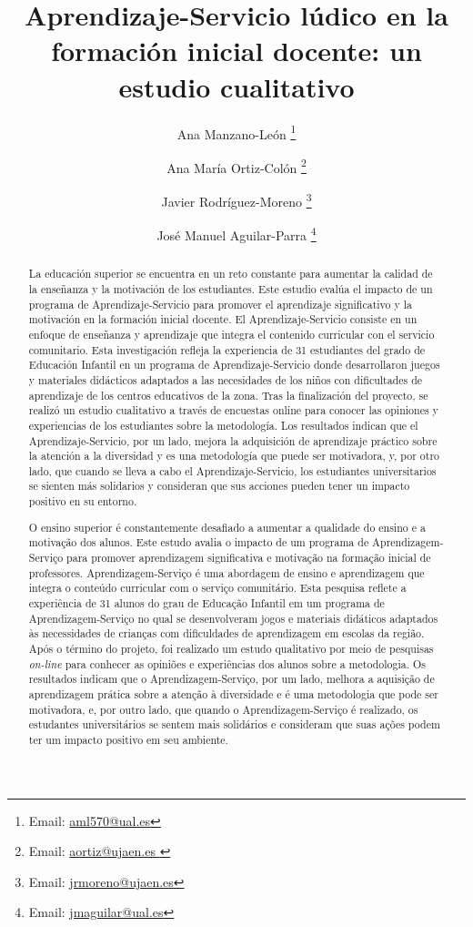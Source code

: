 \documentclass[spanish]{textolivre}
\title{Aprendizaje-Servicio lúdico en la formación inicial docente: un estudio cualitativo}
\author[1]{Ana Manzano-León  \orcid{0000-0001-6966-0355} \thanks{Email: \href{mailto:aml570@ual.es}{aml570@ual.es}}}
\author[2]{Ana María Ortiz-Colón  \orcid{0000-0003-0440-6107} \thanks{Email: \href{mailto:aortiz@ujaen.es}{aortiz@ujaen.es }}}
\author[2]{Javier Rodríguez-Moreno \orcid{0000-0002-5890-3654}
\thanks{Email: \href{mailto:jrmoreno@ujaen.es}{jrmoreno@ujaen.es}}}
\author[1]{José Manuel Aguilar-Parra \orcid{0000-0002-6703-0680} \thanks{Email: \href{mailto:jmaguilar@ual.es}{jmaguilar@ual.es}}}
\affil[1]{Universidad de Almería, Departamento de Psicología, Almería, España.}
\affil[2]{Universidad de Jaén, Departamento de Pedagogía, Jaén, España.}
\begin{document}
\maketitle

\begin{polyabstract}
\begin{abstract}
La educación superior se encuentra en un reto constante para aumentar la calidad de la enseñanza y la motivación de los estudiantes. Este estudio evalúa el impacto de un programa de Aprendizaje-Servicio para promover el aprendizaje significativo y la motivación en la formación inicial docente. El Aprendizaje-Servicio consiste en un enfoque de enseñanza y aprendizaje que integra el contenido curricular con el servicio comunitario. Esta investigación refleja la experiencia de 31 estudiantes del grado de Educación Infantil en un programa de Aprendizaje-Servicio donde desarrollaron juegos y materiales didácticos adaptados a las necesidades de los niños con dificultades de aprendizaje de los centros educativos de la zona. Tras la finalización del proyecto, se realizó un estudio cualitativo a través de encuestas online para conocer las opiniones y experiencias de los estudiantes sobre la metodología. Los resultados indican que el Aprendizaje-Servicio, por un lado, mejora la adquisición de aprendizaje práctico sobre la atención a la diversidad y es una metodología que puede ser motivadora, y, por otro lado, que cuando se lleva a cabo el Aprendizaje-Servicio, los estudiantes universitarios se sienten más solidarios y consideran que sus acciones pueden tener un impacto positivo en su entorno.

\end{abstract}

\begin{portuguese}
\begin{abstract}
O ensino superior é constantemente desafiado a aumentar a qualidade do ensino e a motivação dos alunos. Este estudo avalia o impacto de um programa de Aprendizagem-Serviço para promover aprendizagem significativa e motivação na formação inicial de professores. Aprendizagem-Serviço é uma abordagem de ensino e aprendizagem que integra o conteúdo curricular com o serviço comunitário. Esta pesquisa reflete a experiência de 31 alunos do grau de Educação Infantil em um programa de Aprendizagem-Serviço no qual se desenvolveram jogos e materiais didáticos adaptados às necessidades de crianças com dificuldades de aprendizagem em escolas da região. Após o término do projeto, foi realizado um estudo qualitativo por meio de pesquisas \textit{on-line} para conhecer as opiniões e experiências dos alunos sobre a metodologia. Os resultados indicam que o Aprendizagem-Serviço, por um lado, melhora a aquisição de aprendizagem prática sobre a atenção à diversidade e é uma metodologia que pode ser motivadora, e, por outro lado, que quando o Aprendizagem-Serviço é realizado, os estudantes universitários se sentem mais solidários e consideram que suas ações podem ter um impacto positivo em seu ambiente.


\end{abstract}
\end{portuguese}
\end{polyabstract}
\end{document}
